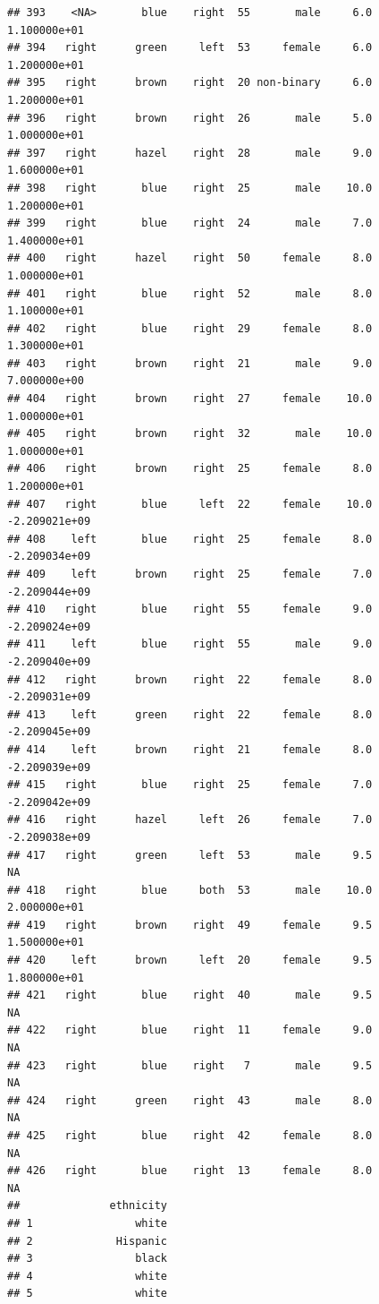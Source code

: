 \documentclass[]{article}
\begin{document}
\begin{verbatim}
## 393    <NA>       blue    right  55       male     6.0  1.100000e+01
## 394   right      green     left  53     female     6.0  1.200000e+01
## 395   right      brown    right  20 non-binary     6.0  1.200000e+01
## 396   right      brown    right  26       male     5.0  1.000000e+01
## 397   right      hazel    right  28       male     9.0  1.600000e+01
## 398   right       blue    right  25       male    10.0  1.200000e+01
## 399   right       blue    right  24       male     7.0  1.400000e+01
## 400   right      hazel    right  50     female     8.0  1.000000e+01
## 401   right       blue    right  52       male     8.0  1.100000e+01
## 402   right       blue    right  29     female     8.0  1.300000e+01
## 403   right      brown    right  21       male     9.0  7.000000e+00
## 404   right      brown    right  27     female    10.0  1.000000e+01
## 405   right      brown    right  32       male    10.0  1.000000e+01
## 406   right      brown    right  25     female     8.0  1.200000e+01
## 407   right       blue     left  22     female    10.0 -2.209021e+09
## 408    left       blue    right  25     female     8.0 -2.209034e+09
## 409    left      brown    right  25     female     7.0 -2.209044e+09
## 410   right       blue    right  55     female     9.0 -2.209024e+09
## 411    left       blue    right  55       male     9.0 -2.209040e+09
## 412   right      brown    right  22     female     8.0 -2.209031e+09
## 413    left      green    right  22     female     8.0 -2.209045e+09
## 414    left      brown    right  21     female     8.0 -2.209039e+09
## 415   right       blue    right  25     female     7.0 -2.209042e+09
## 416   right      hazel     left  26     female     7.0 -2.209038e+09
## 417   right      green     left  53       male     9.5            NA
## 418   right       blue     both  53       male    10.0  2.000000e+01
## 419   right      brown    right  49     female     9.5  1.500000e+01
## 420    left      brown     left  20     female     9.5  1.800000e+01
## 421   right       blue    right  40       male     9.5            NA
## 422   right       blue    right  11     female     9.0            NA
## 423   right       blue    right   7       male     9.5            NA
## 424   right      green    right  43       male     8.0            NA
## 425   right       blue    right  42     female     8.0            NA
## 426   right       blue    right  13     female     8.0            NA
##              ethnicity
## 1                white
## 2             Hispanic
## 3                black
## 4                white
## 5                white

\end{verbatim}
\end{document}
